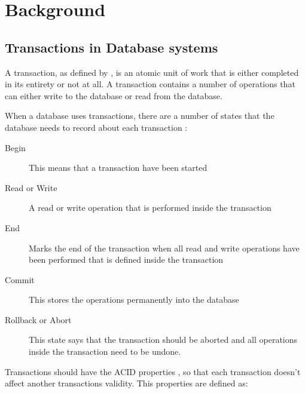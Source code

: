 
\section{Background} %
\label{sec:background}

\subsection{Transactions in Database systems}
\label{sub:db}

A transaction, as defined by \cite{Elmasri2004}, is an atomic unit of work that is either completed in its entirety or not at all. A transaction contains a number of operations that can either write to the database or read from the database. 

When a database uses transactions, there are a number of states that the database needs to record about each transaction \cite[]{Elmasri2004}:

\begin{description}
	\item[Begin] This means that a transaction have been started
	\item[Read or Write] A read or write operation that is performed inside the transaction
	\item[End] Marks the end of the transaction when all read and write operations have been performed that is defined inside the transaction
	\item[Commit] This stores the operations permanently into the database 
	\item[Rollback or Abort] This state says that the transaction should be aborted and all operations inside the transaction need to be undone.
\end{description}


Transactions should have the ACID properties \cite[]{Haerder83}, so that each transaction doesn't affect another transactions validity. This properties are defined as:

